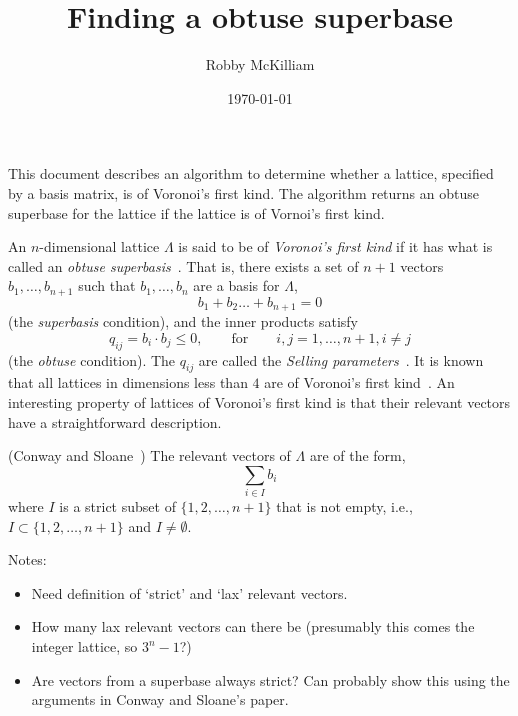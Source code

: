 \documentclass[a4paper,10pt]{article}
\title{Finding a obtuse superbase}
\author{Robby McKilliam}
\date{\today}
\begin{document}
\maketitle

This document describes an algorithm to determine whether a lattice, specified by a basis matrix, is of Voronoi's first kind.  The algorithm returns an obtuse superbase for the lattice if the lattice is of Vornoi's first kind.

An $n$-dimensional lattice $\Lambda$ is said to be of \emph{Voronoi's first kind} if it has what is called an \emph{obtuse superbasis}~\cite{ConwaySloane1992_voronoi_lattice_3d_obtuse_superbases}.  That is, there exists a set of $n+1$ vectors $b_1,\dots,b_{n+1}$ such that $b_1,\dots,b_n$ are a basis for $\Lambda$,
\begin{equation}\label{eq:superbasecond}
b_1 + b_2 \dots + b_{n+1} = 0
\end{equation}
(the \emph{superbasis} condition), and the inner products satisfy
\begin{equation}\label{eq:obtusecond}
q_{ij} = b_i \cdot b_j \leq 0, \qquad \text{for} \qquad i,j = 1,\dots,n+1, i \neq j
\end{equation}
(the \emph{obtuse} condition).  The $q_{ij}$ are called the \emph{Selling parameters}~\cite{Selling1874}.  It is known that all lattices in dimensions less than $4$ are of Voronoi's first kind~\cite{ConwaySloane1992_voronoi_lattice_3d_obtuse_superbases}.  An interesting property of lattices of Voronoi's first kind is that their relevant vectors have a straightforward description.

\begin{theorem} \label{thm:revvecssuperbase} (Conway and Sloane~\cite[Theorem~3]{ConwaySloane1992_voronoi_lattice_3d_obtuse_superbases})
The relevant vectors of $\Lambda$ are of the form,
\[
\sum_{i \in I} b_i
\]
where $I$ is a strict subset of $\{1, 2, \dots, n+1\}$ that is not empty, i.e., $I \subset \{1, 2, \dots, n+1\}$ and $I \neq \emptyset$.
\end{theorem}  

Notes:
\begin{itemize}
\item Need definition of `strict' and `lax' relevant vectors. 
\item How many lax relevant vectors can there be (presumably this comes the integer lattice, so $3^{n}-1$?)
\item Are vectors from a superbase always strict?  Can probably show this using the arguments in Conway and Sloane's paper.
\end{itemize}
\end{document}
